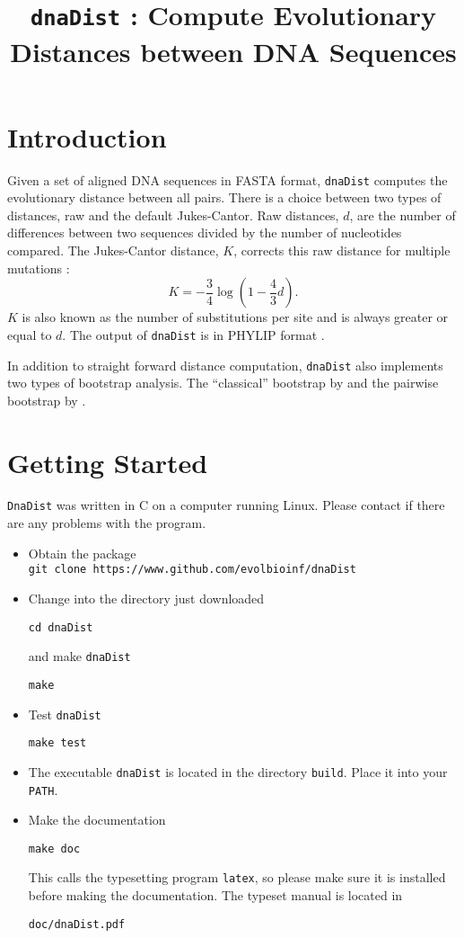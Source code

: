 \documentclass[a4paper, english]{article}
\newcommand{\ty}{\texttt}
\begin{document}
\title{\texttt{dnaDist} : Compute Evolutionary
  Distances between DNA Sequences}
\author{}

\date{}
\maketitle

\section{Introduction} 
Given a set of aligned DNA sequences in FASTA format, \ty{dnaDist}
computes the evolutionary distance between all pairs. There is a
choice between two types of distances, raw and the default
Jukes-Cantor. Raw distances, $d$, are the number of differences between two
sequences divided by the number of nucleotides compared. The
Jukes-Cantor distance, $K$, corrects this raw distance for
multiple mutations \citep{juk69:evo}:
\[
K=-\frac{3}{4}\log\left(1-\frac{4}{3}d\right).
\]
$K$ is also known as the number of substitutions per site and is
always greater or equal to $d$. The output of \ty{dnaDist} is in
PHYLIP format \citep{fel05:phy}.

In addition to straight forward distance computation, \ty{dnaDist}
also implements two types of bootstrap analysis. The ``classical''
bootstrap by \cite{fel85:con} and the pairwise bootstrap
by \cite{klo16:sup}. 

\section{Getting Started}
\texttt{DnaDist} was written in C on a computer running Linux.
Please contact \texttt{} if there are any problems
with the program.
\begin{itemize}
\item Obtain the package\\
\texttt{git clone https://www.github.com/evolbioinf/dnaDist}
\item Change into the directory just downloaded
\begin{verbatim}
cd dnaDist
\end{verbatim}
and make \texttt{dnaDist}
\begin{verbatim}
make
\end{verbatim}
\item Test \texttt{dnaDist}
\begin{verbatim}
make test
\end{verbatim}
\item The executable \texttt{dnaDist} is located in the
  directory \texttt{build}. Place it into your \texttt{PATH}.
\item Make the documentation
\begin{verbatim}
make doc
\end{verbatim}
This calls the typesetting program \texttt{latex}, so please make sure
it is installed before making the documentation. The typeset manual is
located in
\begin{verbatim}
doc/dnaDist.pdf
\end{verbatim}
\end{itemize}
\end{document}
